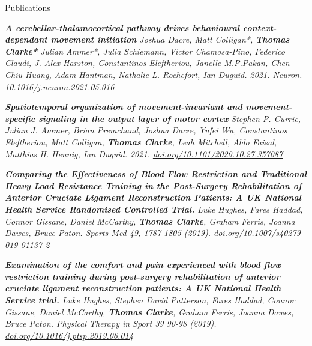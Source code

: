 \documentclass{resume} %
\begin{document}
\begin{rSection}{Publications}

{\sl \textbf{A cerebellar-thalamocortical pathway drives behavioural context-dependant movement initiation} Joshua Dacre, Matt Colligan*, \textbf{Thomas Clarke*} Julian Ammer*, Julia Schiemann, Victor Chamosa-Pino, Federico Claudi, J. Alex Harston, Constantinos Eleftheriou, Janelle M.P.Pakan, Chen-Chiu Huang, Adam Hantman, Nathalie L. Rochefort, Ian Duguid. 2021. Neuron. \href{https://www.sciencedirect.com/science/article/pii/S0896627321003561}{10.1016/j.neuron.2021.05.016}}

{\sl \textbf{Spatiotemporal organization of movement-invariant and movement-specific signaling in the output layer of motor cortex} Stephen P. Currie, Julian J. Ammer, Brian Premchand, Joshua Dacre, Yufei Wu, Constantinos Eleftheriou, Matt Colligan, \textbf{Thomas Clarke}, Leah Mitchell,  Aldo Faisal, Matthias H. Hennig,  Ian Duguid. 2021. \href{https://www.biorxiv.org/content/10.1101/2020.10.27.357087v2}{doi.org/10.1101/2020.10.27.357087}}

{\sl \textbf{Comparing the Effectiveness of Blood Flow Restriction and Traditional Heavy Load Resistance Training in the Post-Surgery Rehabilitation of Anterior Cruciate Ligament Reconstruction Patients: A UK National Health Service Randomised Controlled Trial.} Luke Hughes, Fares Haddad, Connor Gissane, Daniel McCarthy, \textbf{Thomas Clarke}, Graham Ferris, Joanna Dawes, Bruce Paton. Sports Med 49, 1787-1805 (2019). \href{https://link.springer.com/article/10.1007/s40279-019-01137-2}{doi.org/10.1007/s40279-019-01137-2}}

{\sl \textbf{Examination of the comfort and pain experienced with blood 
flow restriction training during post-surgery rehabilitation of anterior cruciate ligament reconstruction patients: A UK National Health Service trial.} Luke Hughes, Stephen David Patterson, Fares Haddad, Connor Gissane, Daniel McCarthy, \textbf{Thomas Clarke}, Graham Ferris, Joanna Dawes, Bruce Paton. Physical Therapy in Sport 39 90-98 (2019).\\ \href{https://www.sciencedirect.com/science/article/abs/pii/S1466853X19302214}{doi.org/10.1016/j.ptsp.2019.06.014}}

\end{rSection}
\end{document}
